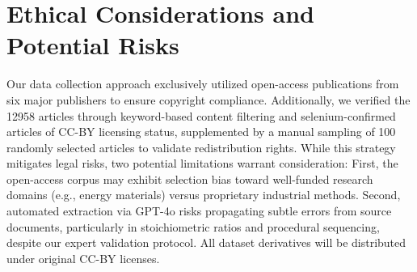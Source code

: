 

\vspace{2em}
\section{Ethical Considerations and Potential Risks}  
\label{sec:appendix_ethics}
Our data collection approach exclusively utilized open-access publications from six major publishers to ensure copyright compliance. 
Additionally, we verified the 12958 articles through keyword-based content filtering and selenium-confirmed articles of CC-BY licensing status, supplemented by a manual sampling of 100 randomly selected articles to validate redistribution rights.
While this strategy mitigates legal risks, two potential limitations warrant consideration: First, the open-access corpus may exhibit selection bias toward well-funded research domains (e.g., energy materials) versus proprietary industrial methods. Second, automated extraction via GPT-4o risks propagating subtle errors from source documents, particularly in stoichiometric ratios and procedural sequencing, despite our expert validation protocol. All dataset derivatives will be distributed under original CC-BY licenses.






